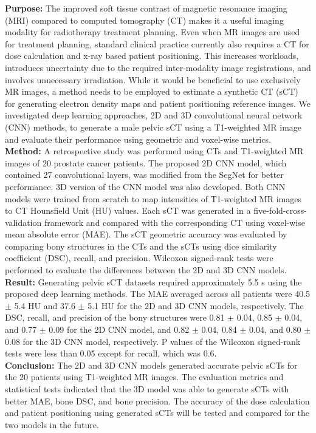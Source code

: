 \textbf{Purpose:} The improved soft tissue contrast of magnetic resonance imaging (MRI) compared to computed tomography (CT) makes it a useful imaging modality for radiotherapy treatment planning. Even when MR images are used for treatment planning, standard clinical practice currently also requires a CT for dose calculation and x-ray based patient positioning. This increases workloads, introduces uncertainty due to the required inter-modality image registrations, and involves unnecessary irradiation. While it would be beneficial to use exclusively MR images, a method needs to be employed to estimate a synthetic CT (sCT) for generating electron density maps and patient positioning reference images. We investigated deep learning approaches, 2D and 3D convolutional neural network (CNN) methods, to generate a male pelvic sCT using a T1-weighted MR image and evaluate their performance using geometric and voxel-wise metrics. \\
\textbf{Method:}
A retrospective study was performed using CTs and T1-weighted MR images of 20 prostate cancer patients. The proposed 2D CNN model, which contained 27 convolutional layers, was modified from the SegNet for better performance.  3D version of the CNN model was also developed. Both CNN models were trained from scratch to map intensities of T1-weighted MR images to CT Hounsfield Unit (HU) values. Each sCT was generated in a five-fold-cross-validation framework and compared with the corresponding CT using voxel-wise mean absolute error (MAE). The sCT geometric accuracy was evaluated by comparing bony structures in the CTs and the sCTs using dice similarity coefficient (DSC), recall, and precision. Wilcoxon signed-rank tests were performed to evaluate the differences between the 2D and 3D CNN models.  \\ 
\textbf{Result:}
Generating pelvic sCT datasets required approximately 5.5 s using the proposed deep learning methods. The MAE averaged across all patients were 40.5 $\pm$ 5.4 HU and 37.6 $\pm$ 5.1 HU for the 2D and 3D CNN models, respectively. The DSC, recall, and precision of the bony structures were 0.81 $\pm$ 0.04, 0.85 $\pm$ 0.04, and 0.77 $\pm$ 0.09 for the 2D CNN model, and 0.82 $\pm$ 0.04, 0.84 $\pm$ 0.04, and 0.80 $\pm$ 0.08 for the 3D CNN model, respectively. P values of the Wilcoxon signed-rank tests were less than 0.05 except for recall, which was 0.6. \\
\textbf{Conclusion:}
The 2D and 3D CNN models generated accurate pelvic sCTs for the 20 patients using T1-weighted MR images. The evaluation metrics and statistical tests indicated that the 3D model was able to generate sCTs with better MAE, bone DSC, and bone precision. The accuracy of the dose calculation and patient positioning using generated sCTs will be tested and compared for the two models in the future. 